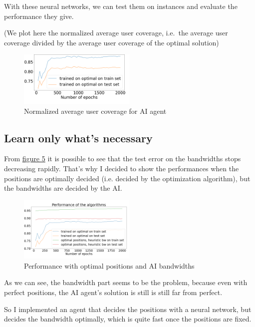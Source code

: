 \documentclass[letterpaper]{article}
\begin{document}
\;

With these neural networks, we can test them on instances and evaluate the performance they give.

(We plot here the normalized average user coverage, i.e.\, the average user coverage divided by the average user coverage of the optimal solution)


\begin{figure}[H]
    \centering
    \includegraphics[width=0.5\textwidth]{images/bilan_en _fonction epochs.png}
    \caption{Normalized average user coverage for AI agent}
\end{figure}

\subsection{Learn only what's necessary}

From \hyperref[fig:image6]{figure 5} it is possible to see that the test error on the bandwidths stops decreasing rapidly.
That's why I decided to show the performances when the positions are optimally decided (i.e. decided by the optimization algorithm), but the bandwidths are decided by the AI.

\begin{figure}[H]
    \centering
    \includegraphics[width=0.5\textwidth]{images/bilan_en _fonction epochs_aibw.png}
    \caption{Performance with optimal positions and AI bandwidths}
\end{figure}

As we can see, the bandwidth part seems to be the problem, because even with perfect positions, the AI agent's solution is still
is still far from perfect.

So I implemented an agent that decides the positions with a neural network, but decides the bandwidth optimally,
which is quite fast once the positions are fixed.
\end{document}
